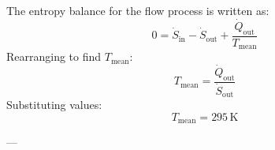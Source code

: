 The entropy balance for the flow process is written as:  
\[
0 = \dot{S}_{\text{in}} - \dot{S}_{\text{out}} + \frac{\dot{Q}_{\text{out}}}{T_{\text{mean}}}
\]  
Rearranging to find \( T_{\text{mean}} \):  
\[
T_{\text{mean}} = \frac{\dot{Q}_{\text{out}}}{\dot{S}_{\text{out}}}
\]  
Substituting values:  
\[
T_{\text{mean}} = 295 \, \text{K}
\]  

---